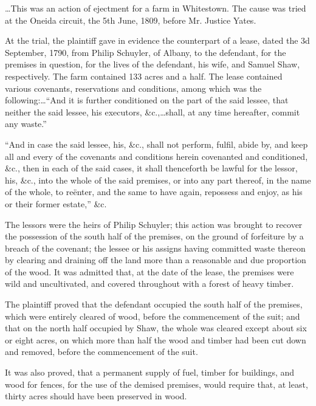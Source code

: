 

\dots This was an action of ejectment for a farm in Whitestown. The cause was
tried at the Oneida circuit, the 5th June, 1809, before Mr. Justice Yates.

At the trial, the plaintiff gave in evidence the counterpart of a lease, dated
the 3d September, 1790, from Philip Schuyler, of Albany, to the defendant, for the premises in
question, for the lives of the defendant, his wife, and Samuel Shaw,
respectively. The farm contained 133 acres and a half. The lease contained
various covenants, reservations and conditions, among which was the
following:\dots``And it is further conditioned on the part of the said lessee,
that
neither the said lessee, his executors, \&c.,\dots shall, at any time
hereafter, commit any waste.''

``And in case the said lessee, his, \&c., shall not perform, fulfil, abide by,
and keep all and every of the covenants and conditions herein covenanted and
conditioned, \&c., then in each of the said cases, it shall thenceforth be
lawful for the lessor, his, \&c., into the whole of the said premises, or into
any part thereof, in the name of the whole, to re\"enter, and the same to have
again, repossess and enjoy, as his or their former estate,'' \&c.

The lessors were the heirs of Philip Schuyler; this action was brought to
recover the possession of the south half of the premises, on the ground of
forfeiture by a breach of the covenant; the lessee or his assigns having
committed waste thereon by clearing and draining off the land more than a
reasonable and due proportion of the wood. It was admitted that, at the date of
the lease, the premises were wild and uncultivated, and covered throughout with
a forest of heavy timber.

The plaintiff proved that the defendant occupied the south half of the premises,
which were entirely cleared of wood, before the commencement of the suit; and
that on the north half occupied by Shaw, the whole was cleared except about six
or eight acres, on which more than half the wood and timber had been cut down
and removed, before the commencement of the suit.

It was also proved, that a permanent supply of fuel, timber for buildings, and
wood for fences, for the use of the demised premises, would require that, at
least, thirty acres should have been preserved in wood.


